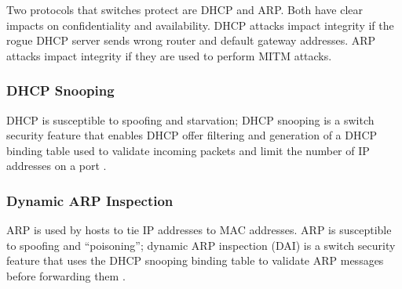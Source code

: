 \documentclass[journal]{IEEEtran}
\begin{document}
Two protocols that switches protect are DHCP and ARP. Both have clear impacts on confidentiality and
availability. DHCP attacks impact integrity if the rogue DHCP server sends wrong router and
default gateway addresses. ARP attacks impact integrity if they are used to perform MITM attacks.

\subsubsection{DHCP Snooping} DHCP is susceptible to spoofing and starvation; DHCP snooping is a
switch security feature that enables DHCP offer filtering and generation of a DHCP binding table
used to validate incoming packets and limit the number of IP addresses on a port \cite{b2}.

\subsubsection{Dynamic ARP Inspection} ARP is used by hosts to tie IP addresses to MAC addresses.
ARP is susceptible to spoofing and ``poisoning''; dynamic ARP inspection (DAI) is a switch security
feature that uses the DHCP snooping binding table to validate ARP messages before forwarding them
\cite{b2}.
\end{document}
